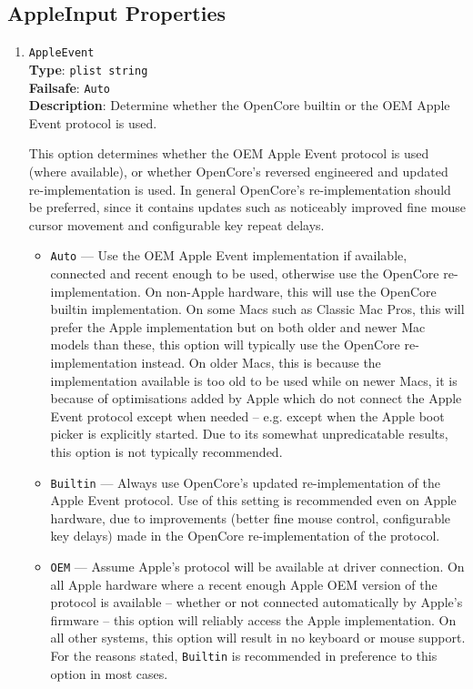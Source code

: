 \documentclass[]{article}
\providecommand{\tightlist}{%
  \setlength{\itemsep}{0pt}\setlength{\parskip}{0pt}}
\begin{document}
\begin{enumerate}
\end{enumerate}

\subsection{AppleInput Properties}\label{uefiappleinputprops}

\begin{enumerate}

\item
  \texttt{AppleEvent}\\
  \textbf{Type}: \texttt{plist\ string}\\
  \textbf{Failsafe}: \texttt{Auto}\\
  \textbf{Description}: Determine whether the OpenCore builtin or the OEM Apple Event protocol is used.

  This option determines whether the OEM Apple Event protocol is used (where available), or
  whether OpenCore's reversed engineered and updated re-implementation is used. In general
  OpenCore's re-implementation should be preferred, since it contains updates such as noticeably
  improved fine mouse cursor movement and configurable key repeat delays.

  \begin{itemize}
  \tightlist
  \item \texttt{Auto} --- Use the OEM Apple Event implementation if available, connected and
  recent enough to be used, otherwise use the OpenCore re-implementation.
  On non-Apple hardware, this will use the OpenCore builtin implementation.
  On some Macs such as Classic Mac Pros, this will prefer the Apple implementation but on both older and
  newer Mac models than these, this option will typically use the OpenCore re-implementation instead.
  On older Macs, this is because the implementation available is too old to be used while on newer Macs,
  it is because of optimisations added by Apple which do not connect the Apple Event protocol
  except when needed -- e.g. except when the Apple boot picker is explicitly started.
  Due to its somewhat unpredicatable results, this option is not typically recommended.
  \item \texttt{Builtin} ---  Always use OpenCore's updated re-implementation of the Apple Event protocol.
  Use of this setting is recommended even on Apple hardware, due to
  improvements (better fine mouse control, configurable key delays) made in the OpenCore re-implementation
  of the protocol.
  \item \texttt{OEM} --- Assume Apple's protocol will be available at driver connection. On all Apple hardware
  where a recent enough Apple OEM version of the protocol is available -- whether or not connected automatically
  by Apple's firmware -- this option will reliably access the Apple implementation. On all other systems, this
  option will result in no keyboard or mouse support. For the reasons stated, \texttt{Builtin} is recommended in
  preference to this option in most cases.
  \end{itemize}


\end{enumerate}
\end{document}
